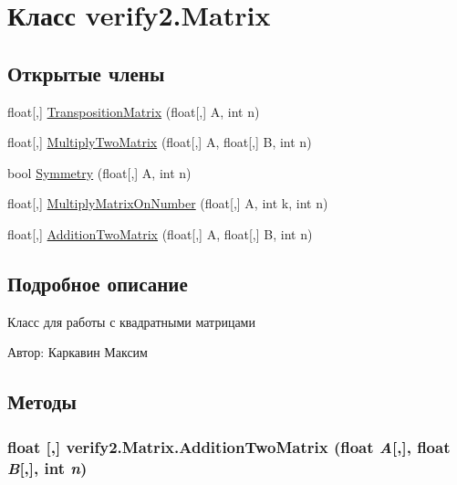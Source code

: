 \hypertarget{classverify2_1_1_matrix}{
\section{Класс verify2.Matrix}
\label{classverify2_1_1_matrix}
}
\subsection*{Открытые члены}
\begin{CompactItemize}
\item 
float\mbox{[},\mbox{]} \hyperlink{classverify2_1_1_matrix_a53ed5a12d31c2d518c8bec2896d34a6}{TranspositionMatrix} (float\mbox{[},\mbox{]} A, int n)
\item 
float\mbox{[},\mbox{]} \hyperlink{classverify2_1_1_matrix_c06fc6f590a0545afbcbb0133350579f}{MultiplyTwoMatrix} (float\mbox{[},\mbox{]} A, float\mbox{[},\mbox{]} B, int n)
\item 
bool \hyperlink{classverify2_1_1_matrix_dc85a1e7fe895e0cb096025d72aa82e9}{Symmetry} (float\mbox{[},\mbox{]} A, int n)
\item 
float\mbox{[},\mbox{]} \hyperlink{classverify2_1_1_matrix_a255bb2ea879291b3fe8a1637f21221c}{MultiplyMatrixOnNumber} (float\mbox{[},\mbox{]} A, int k, int n)
\item 
float\mbox{[},\mbox{]} \hyperlink{classverify2_1_1_matrix_b9c73bb4474e2d7b4175d05eacc57669}{AdditionTwoMatrix} (float\mbox{[},\mbox{]} A, float\mbox{[},\mbox{]} B, int n)
\end{CompactItemize}


\subsection{Подробное описание}
Класс для работы с квадратными матрицами

\begin{Desc}
\item[Автор:]Каркавин Максим \end{Desc}


\subsection{Методы}
\hypertarget{classverify2_1_1_matrix_b9c73bb4474e2d7b4175d05eacc57669}{
\subsubsection[{AdditionTwoMatrix}]{\setlength{\rightskip}{0pt plus 5cm}float \mbox{[},\mbox{]} verify2.Matrix.AdditionTwoMatrix (float {\em A}\mbox{[},\mbox{]}, \/  float {\em B}\mbox{[},\mbox{]}, \/  int {\em n})}}
\label{classverify2_1_1_matrix_b9c73bb4474e2d7b4175d05eacc57669}


